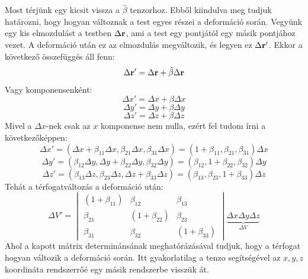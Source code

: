 \documentclass[a4paper,12pt]{article}
\begin{document}
Most térjünk egy kicsit vissza a $\hat{\beta}$ tenzorhoz. Ebből kiindulva meg tudjuk határozni, hogy hogyan változnak a test egyes részei a deformáció során. Vegyünk egy kis elmozdulást a testben $\Delta \bold{r}$, ami a test egy pontjától egy másik pontjához vezet. A deformáció után ez az elmozdulás megváltozik, és legyen ez $\Delta \bold{r'}$. Ekkor a következő összefüggés áll fenn:
\begin{equation}
    \Delta \bold{r'} = \Delta \bold{r} + \hat{\beta} \Delta \bold{r}
\end{equation}
Vagy komponensenként:
\begin{equation}
    \Delta x' = \Delta x + \beta \Delta x
\end{equation}
\begin{equation}
    \Delta y' = \Delta y + \beta \Delta y
\end{equation}
\begin{equation}
    \Delta z' = \Delta z + \beta \Delta z
\end{equation}
Mivel a $\Delta x$-nek csak az $x$ komponense nem nulla, ezért fel tudom írni a következőképpen:
\begin{equation}
    \Delta x' = (\Delta x + \beta_{11} \Delta x, \beta_{21} \Delta x, \beta_{31} \Delta x) = (1 + \beta_{11}, \beta_{21}, \beta_{31}) \Delta x
\end{equation}
\begin{equation}
    \Delta y' = (\beta_{12} \Delta y, \Delta y + \beta_{22} \Delta y, \beta_{32} \Delta y) = (\beta_{12}, 1 + \beta_{22}, \beta_{32}) \Delta y
\end{equation}
\begin{equation}
    \Delta z' = (\beta_{13} \Delta z, \beta_{23} \Delta z, \Delta z + \beta_{33} \Delta z) = (\beta_{13}, \beta_{23}, 1 + \beta_{33}) \Delta z
\end{equation}
Tehát a térfogatváltozás a deformáció után:
\begin{equation}
    \Delta V' = \begin{vmatrix}
        (1 + \beta_{11}) & \beta_{12} & \beta_{13} \\
        \beta_{21} & (1 + \beta_{22}) & \beta_{23} \\
        \beta_{31} & \beta_{32} & (1 + \beta_{33})
    \end{vmatrix} \underbrace{\Delta x \Delta y \Delta z}_{\Delta V}
\end{equation}
Ahol a kapott mátrix determinánsának meghatórázásával tudjuk, hogy a térfogat hogyan változik a deformáció során. Itt gyakorlatilag a tenzo segítségével az $x,y,z$ koordináta rendszerrőé egy másik rendszerbe visszük át.
\end{document}
